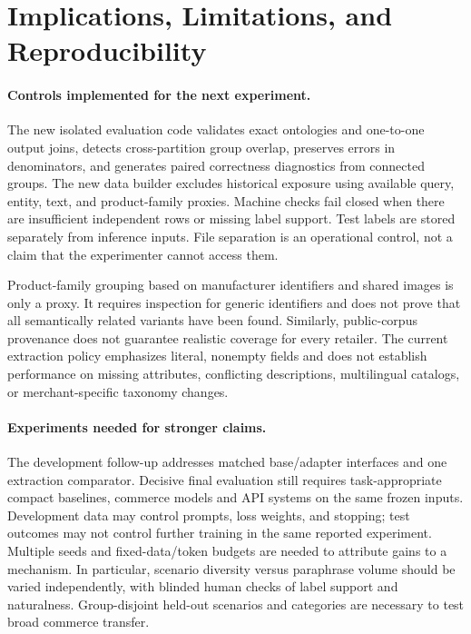 
\section{Implications, Limitations, and Reproducibility}
\paragraph{Controls implemented for the next experiment.}
The new isolated evaluation code validates exact ontologies and one-to-one output joins, detects cross-partition group overlap, preserves errors in denominators, and generates paired correctness diagnostics from connected groups. The new data builder excludes historical exposure using available query, entity, text, and product-family proxies. Machine checks fail closed when there are insufficient independent rows or missing label support. Test labels are stored separately from inference inputs. File separation is an operational control, not a claim that the experimenter cannot access them.

Product-family grouping based on manufacturer identifiers and shared images is only a proxy. It requires inspection for generic identifiers and does not prove that all semantically related variants have been found. Similarly, public-corpus provenance does not guarantee realistic coverage for every retailer. The current extraction policy emphasizes literal, nonempty fields and does not establish performance on missing attributes, conflicting descriptions, multilingual catalogs, or merchant-specific taxonomy changes.

\paragraph{Experiments needed for stronger claims.}
The development follow-up addresses matched base/adapter interfaces and one extraction comparator. Decisive final evaluation still requires task-appropriate compact baselines, commerce models and API systems on the same frozen inputs. Development data may control prompts, loss weights, and stopping; test outcomes may not control further training in the same reported experiment. Multiple seeds and fixed-data/token budgets are needed to attribute gains to a mechanism. In particular, scenario diversity versus paraphrase volume should be varied independently, with blinded human checks of label support and naturalness. Group-disjoint held-out scenarios and categories are necessary to test broad commerce transfer.

